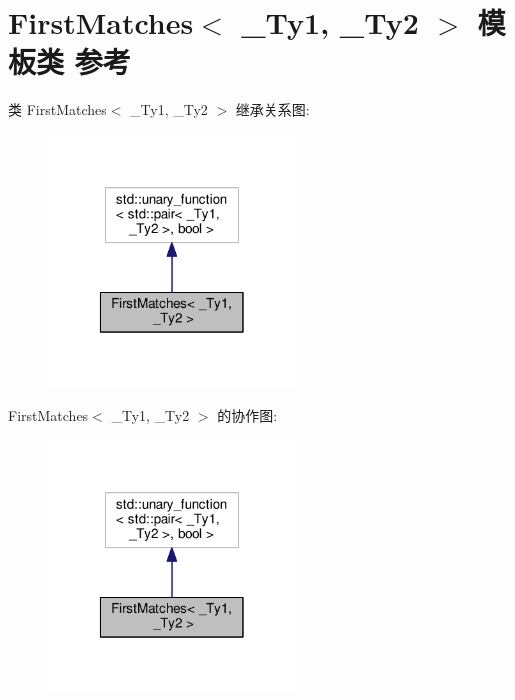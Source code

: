 \hypertarget{class_first_matches}{\section{First\+Matches$<$ \+\_\+\+Ty1, \+\_\+\+Ty2 $>$ 模板类 参考}
\label{class_first_matches}
}


类 First\+Matches$<$ \+\_\+\+Ty1, \+\_\+\+Ty2 $>$ 继承关系图\+:
\nopagebreak
\begin{figure}[H]
\begin{center}
\leavevmode
\includegraphics[width=186pt]{class_first_matches__inherit__graph}
\end{center}
\end{figure}


First\+Matches$<$ \+\_\+\+Ty1, \+\_\+\+Ty2 $>$ 的协作图\+:
\nopagebreak
\begin{figure}[H]
\begin{center}
\leavevmode
\includegraphics[width=186pt]{class_first_matches__coll__graph}
\end{center}
\end{figure}
